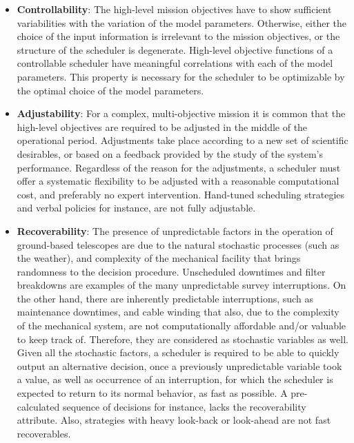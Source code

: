 \documentclass[12pt]{aastex62}
\theoremstyle{definition}
\begin{document}
\begin{itemize}
\item \textbf{Controllability}: The high-level mission objectives have to show sufficient variabilities with the variation of the model parameters. Otherwise, either the choice of the input  information is irrelevant to the mission objectives, or the structure of the scheduler is degenerate. High-level objective functions of a controllable scheduler have meaningful correlations with each of the model parameters. This property is necessary for the scheduler to be optimizable by the optimal choice of the model parameters.

\item \textbf{Adjustability}: For a complex, multi-objective mission it is common that the high-level objectives are required to be adjusted in the middle of the operational period. Adjustments take place according to a new set of scientific desirables, or based on a feedback provided by the study of the system's performance. Regardless of the reason for the adjustments, a scheduler must offer a systematic flexibility to be adjusted with a reasonable computational cost, and preferably no expert intervention. Hand-tuned scheduling strategies and verbal policies for instance, are not fully adjustable.

\item \textbf{Recoverability}: The presence of unpredictable factors in the operation of ground-based telescopes are due to the natural stochastic processes (such as the weather), and complexity of the mechanical facility that brings randomness to the decision procedure. Unscheduled downtimes and filter breakdowns are examples of the many unpredictable survey interruptions. On the other hand, there are inherently predictable interruptions, such as maintenance downtimes, and cable winding that also, due to the complexity of the mechanical system, are not computationally affordable and/or valuable to keep track of. Therefore, they are considered as stochastic variables as well. Given all the stochastic factors, a scheduler is required to be able to quickly output an alternative decision, once a previously unpredictable variable took a value, as well as occurrence of an interruption, for which the scheduler is expected to return to its normal behavior, as fast as possible. A pre-calculated sequence of decisions for instance, lacks the recoverability attribute. Also, strategies with heavy look-back or look-ahead are not fast recoverables. 
\end{itemize}
\end{document}

